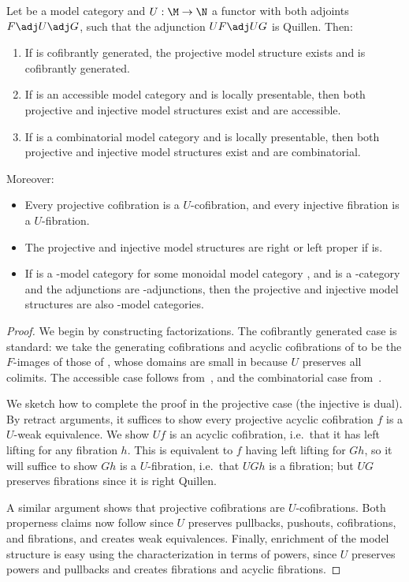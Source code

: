 \begin{prop}\label{thm:projmodel-gen}
  Let \N be a model category and $U:\M\to\N$ a functor with both adjoints $F\adj U \adj G$, such that the adjunction $U F \adj U G$ is Quillen.
  Then:
  \begin{enumerate}
  \item If \N is cofibrantly generated, the projective model structure exists and is cofibrantly generated.
  \item If \N is an accessible model category and \M is locally presentable, then both projective and injective model structures exist and are accessible.
  \item If \N is a combinatorial model category and \M is locally presentable, then both projective and injective model structures exist and are combinatorial.
  \end{enumerate}
  Moreover:
  \begin{itemize}
  \item Every projective cofibration is a $U$-cofibration, and every injective fibration is a $U$-fibration.
  \item The projective and injective model structures are right or left proper if \N is.
  \item If \N is a \V-model category for some monoidal model category \V, and \M is a \V-category and the adjunctions are \V-adjunctions, then the projective and injective model structures are also \V-model categories.
  \end{itemize}
\end{prop}
\begin{proof}
  We begin by constructing factorizations.
  The cofibrantly generated case is standard: we take the generating cofibrations and acyclic cofibrations of \M to be the $F$-images of those of \N, whose domains are small in \M because $U$ preserves all colimits.
  The accessible case follows from~\cite{gkr:liftacc-modelstr}, and the combinatorial case from~\cite[Remark 3.8]{mr:cellular}.

  We sketch how to complete the proof in the projective case (the injective is dual).
  By retract arguments, it suffices to show every projective acyclic cofibration $f$ is a $U$-weak equivalence.
  We show $U f$ is an acyclic cofibration, i.e.\ that it has left lifting for any fibration $h$.
  This is equivalent to $f$ having left lifting for $G h$, so it will suffice to show $G h$ is a $U$-fibration, i.e.\ that $U G h$ is a fibration; but $U G$ preserves fibrations since it is right Quillen.

  A similar argument shows that projective cofibrations are $U$-cofibrations.
  Both properness claims now follow since $U$ preserves pullbacks, pushouts, cofibrations, and fibrations, and creates weak equivalences.
  Finally, enrichment of the model structure is easy using the characterization in terms of powers, since $U$ preserves powers and pullbacks and creates fibrations and acyclic fibrations.
\end{proof}

